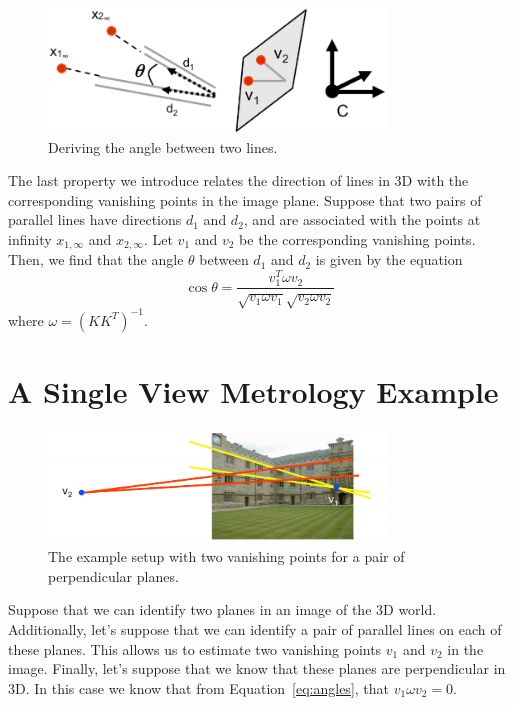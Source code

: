 \documentclass[a4paper, 12pt]{article}
\begin{document}
\begin{figure}[h!]
\centering
\includegraphics[width=0.8\textwidth]{figures/angles.png}
\caption{Deriving the angle between two lines.}
\label{fig:angles}
\end{figure}

The last property we introduce relates the direction of lines in 3D with the corresponding vanishing points in the image plane. Suppose that two pairs of parallel lines have directions $d_1$ and $d_2$, and are associated with the points at infinity $x_{1,\infty}$ and $x_{2,\infty}$. Let $v_1$ and $v_2$ be the corresponding vanishing points. Then, we find that the angle $\theta$ between $d_1$ and $d_2$ is given by the equation
\begin{equation}
\cos\theta = \frac{v_1^T\omega v_2}{\sqrt{v_1 \omega v_1}\sqrt{v_2 \omega v_2}}
\label{eq:angles}
\end{equation}
where $\omega = (KK^T)^{-1}$. 

\section{A Single View Metrology Example}
\begin{figure}[h!]
\centering
\includegraphics[width=0.8\textwidth]{figures/example1.png}
\caption{The example setup with two vanishing points for a pair of perpendicular planes.}
\label{fig:example1}
\end{figure}
Suppose that we can identify two planes in an image of the 3D world. Additionally, let's suppose that we can identify a pair of parallel lines on each of these planes. This allows us to estimate two vanishing points $v_1$ and $v_2$ in the image. Finally, let's suppose that we know that these planes are perpendicular in 3D. In this case we know that from Equation~\ref{eq:angles}, that $v_1\omega v_2 = 0$. 
\end{document}
